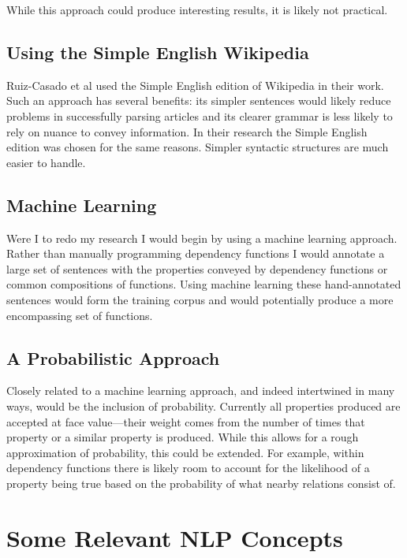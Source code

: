 While this approach could produce interesting results, it is likely not practical.

\section{Using the Simple English Wikipedia}

Ruiz-Casado et al \cite{Ruiz-casado05automaticassignment} used the Simple English edition of Wikipedia in their work.  Such an approach has several benefits: its simpler sentences would likely reduce problems in successfully parsing articles and its clearer grammar is less likely to rely on nuance to convey information.  In their research the Simple English edition was chosen for the same reasons.  Simpler syntactic structures are much easier to handle.

\section{Machine Learning}

Were I to redo my research I would begin by using a machine learning approach.  Rather than manually programming dependency functions I would annotate a large set of sentences with the properties conveyed by dependency functions or common compositions of functions.  Using machine learning these hand-annotated sentences would form the training corpus and would potentially produce a more encompassing set of functions.  

\section{A Probabilistic Approach}

Closely related to a machine learning approach, and indeed intertwined in many ways, would be the inclusion of probability.  Currently all properties produced are accepted at face value---their weight comes from the number of times that property or a similar property is produced.  While this allows for a rough approximation of probability, this could be extended.  For example, within dependency functions there is likely room to account for the likelihood of a property being true based on the probability of what nearby relations consist of.

\appendix

\chapter{Some Relevant NLP Concepts}


